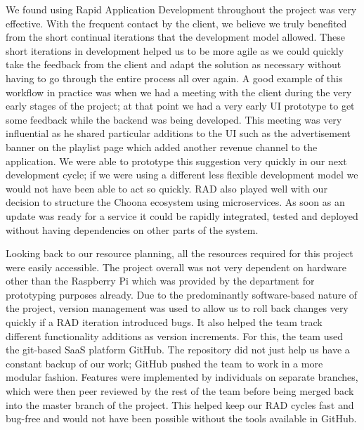 We found using Rapid Application Development throughout the project was very effective. With the frequent contact by the client, we believe we truly benefited from the short continual iterations that the development model allowed. These short iterations in development helped us to be more agile as we could quickly take the feedback from the client and adapt the solution as necessary without having to go through the entire process all over again. A good example of this workflow in practice was when we had a meeting with the client during the very early stages of the project; at that point we had a very early UI prototype to get some feedback while the backend was being developed. This meeting was very influential as he shared particular additions to the UI such as the advertisement banner on the playlist page which added another revenue channel to the application. We were able to prototype this suggestion very quickly in our next development cycle; if we were using a different less flexible development model we would not have been able to act so quickly. RAD also played well with our decision to structure the Choona ecosystem using microservices. As soon as an update was ready for a service it could be rapidly integrated, tested and deployed without having dependencies on other parts of the system.

Looking back to our resource planning, all the resources required for this project were easily accessible. The project overall was not very dependent on hardware other than the Raspberry Pi which was provided by the department for prototyping purposes already. Due to the predominantly software-based nature of the project, version management was used to allow us to roll back changes very quickly if a RAD iteration introduced bugs. It also helped the team track different functionality additions as version increments. For this, the team used the git-based SaaS platform GitHub. The repository did not just help us have a constant backup of our work; GitHub pushed the team to work in a more modular fashion. Features were implemented by individuals on separate branches, which were then peer reviewed by the rest of the team before being merged back into the master branch of the project. This helped keep our RAD cycles fast and bug-free and would not have been possible without the tools available in GitHub.

